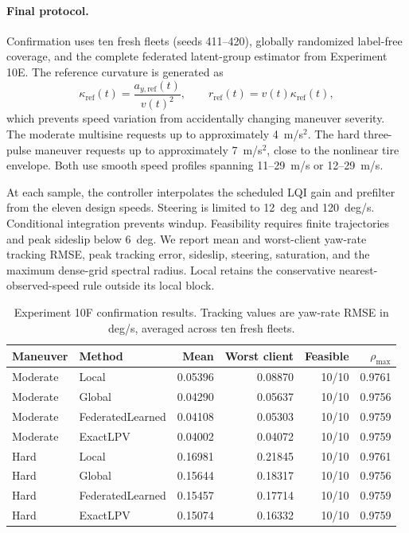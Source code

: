 \paragraph{Final protocol.}
Confirmation uses ten fresh fleets (seeds 411--420), globally randomized
label-free coverage, and the complete federated latent-group estimator from
Experiment 10E. The reference curvature is generated as
\begin{equation}
 \kappa_{\mathrm{ref}}(t)=\frac{a_{y,\mathrm{ref}}(t)}{v(t)^2},
 \qquad r_{\mathrm{ref}}(t)=v(t)\kappa_{\mathrm{ref}}(t),
\end{equation}
which prevents speed variation from accidentally changing maneuver severity.
The moderate multisine requests up to approximately 4~m/s$^2$. The hard
three-pulse maneuver requests up to approximately 7~m/s$^2$, close to the
nonlinear tire envelope. Both use smooth speed profiles spanning 11--29~m/s or
12--29~m/s.

At each sample, the controller interpolates the scheduled LQI gain and
prefilter from the eleven design speeds. Steering is limited to 12~deg and
120~deg/s. Conditional integration prevents windup. Feasibility requires
finite trajectories and peak sideslip below 6~deg. We report mean and
worst-client yaw-rate tracking RMSE, peak tracking error, sideslip, steering,
saturation, and the maximum dense-grid spectral radius. Local retains the
conservative nearest-observed-speed rule outside its local block.

\begin{table}[htbp]
\centering
\caption{Experiment 10F confirmation results. Tracking values are yaw-rate
RMSE in deg/s, averaged across ten fresh fleets.}
\label{tab:experiment10f-summary}
\begin{tabular}{llrrrr}
\toprule
Maneuver & Method & Mean & Worst client & Feasible & $\rho_{\max}$\\
\midrule
Moderate & Local            & 0.05396 & 0.08870 & 10/10 & 0.9761\\
Moderate & Global           & 0.04290 & 0.05637 & 10/10 & 0.9756\\
Moderate & FederatedLearned & 0.04108 & 0.05303 & 10/10 & 0.9759\\
Moderate & ExactLPV         & 0.04002 & 0.04072 & 10/10 & 0.9759\\
\midrule
Hard & Local                & 0.16981 & 0.21845 & 10/10 & 0.9761\\
Hard & Global               & 0.15644 & 0.18317 & 10/10 & 0.9756\\
Hard & FederatedLearned     & 0.15457 & 0.17714 & 10/10 & 0.9759\\
Hard & ExactLPV             & 0.15074 & 0.16332 & 10/10 & 0.9759\\
\bottomrule
\end{tabular}
\end{table}

